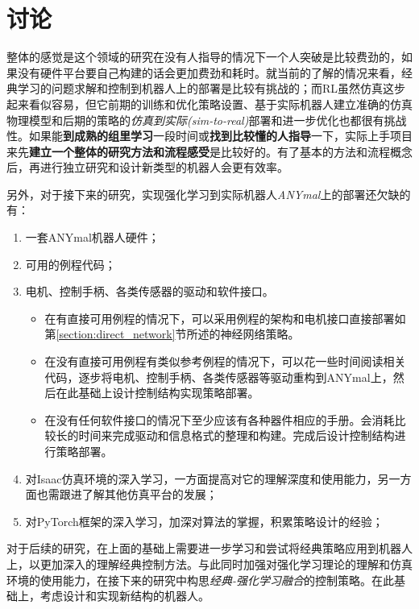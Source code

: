 
\chapter[讨论]{讨论}
整体的感觉是这个领域的研究在没有人指导的情况下一个人突破是比较费劲的，如果没有硬件平台要自己构建的话会更加费劲和耗时。就当前的了解的情况来看，经典学习的问题求解和控制到机器人上的部署是比较有挑战的；而RL虽然仿真这步起来看似容易，但它前期的训练和优化策略设置、基于实际机器人建立准确的仿真物理模型和后期的策略的\emph{仿真到实际(sim-to-real)}部署和进一步优化也都很有挑战性。如果能\textbf{到成熟的组里学习}一段时间或\textbf{找到比较懂的人指导}一下，实际上手项目来先\textbf{建立一个整体的研究方法和流程感受}是比较好的。有了基本的方法和流程概念后，再进行独立研究和设计新类型的机器人会更有效率。

另外，对于接下来的研究，实现强化学习到实际机器人\emph{ANYmal}上的部署还欠缺的有：
\begin{enumerate}
    \item 一套ANYmal机器人硬件；
    \item 可用的例程代码；
    \item 电机、控制手柄、各类传感器的驱动和软件接口。
    \begin{itemize}
        \item 在有直接可用例程的情况下，可以采用例程的架构和电机接口直接部署如第\ref{section:direct_network}节所述的神经网络策略。
        \item 在没有直接可用例程有类似参考例程的情况下，可以花一些时间阅读相关代码，逐步将电机、控制手柄、各类传感器等驱动重构到ANYmal上，然后在此基础上设计控制结构实现策略部署。
        \item 在没有任何软件接口的情况下至少应该有各种器件相应的手册。会消耗比较长的时间来完成驱动和信息格式的整理和构建。完成后设计控制结构进行策略部署。
    \end{itemize}
    \item 对Isaac仿真环境的深入学习，一方面提高对它的理解深度和使用能力，另一方面也需跟进了解其他仿真平台的发展；
    \item 对PyTorch框架的深入学习，加深对算法的掌握，积累策略设计的经验；
\end{enumerate}

对于后续的研究，在上面的基础上需要进一步学习和尝试将经典策略应用到机器人上，以更加深入的理解经典控制方法。与此同时加强对强化学习理论的理解和仿真环境的使用能力，在接下来的研究中构思\emph{经典-强化学习融合}的控制策略。在此基础上，考虑设计和实现新结构的机器人。